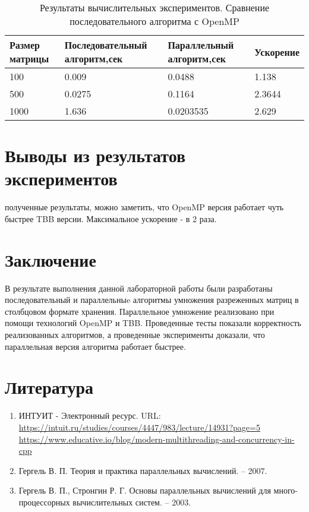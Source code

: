 \documentclass{report}
\begin{document}
\begin{table}[!h]
\caption{Результаты вычислительных экспериментов. Сравнение последовательного алгоритма с OpenMP}
\centering
\begin{tabular}{|p{4cm}|p{4cm}|p{4cm}|p{3cm}|}
\hline
Размер матрицы & Последовательный алгоритм,сек & Параллельный алгоритм,сек & Ускорение  \\\hline
100  & 0.009 & 0.0488 & 1.138  \\\hline
500  & 0.0275 & 0.1164 & 2.3644  \\\hline
1000  & 1.636 & 0.0203535 & 2.629  \\
\hline
\end{tabular}
\end{table}

\newpage

\section*{Выводы из результатов экспериментов}
 полученные результаты, можно заметить, что OpenMP версия работает чуть быстрее TBB  версии. Максимальное ускорение - в  2  раза.
\newpage

\section*{Заключение}
В результате выполнения   данной лабораторной работы были разработаны последовательный и параллельныe алгоритмы умножения разреженных матриц в столбцовом формате хранения. Параллельное умножение реализовано при помощи технологий OpenMP и TBB. Проведенные тесты показали корректность реализованных алгоритмов, а проведенные эксперименты доказали, что параллельная версия алгоритма работает быстрее.

\newpage

\section*{Литература}
\begin{enumerate}
\item ИНТУИТ - Электронный ресурс. URL: \newline \url{https://intuit.ru/studies/courses/4447/983/lecture/14931?page=5}
 \url{https://www.educative.io/blog/modern-multithreading-and-concurrency-in-cpp}
\item Гергель В. П. Теория и практика параллельных вычислений. – 2007.
\item  Гергель В. П., Стронгин Р. Г. Основы параллельных вычислений для много-
процессорных вычислительных систем. – 2003.
\end{enumerate} 
\newpage
\end{document}
